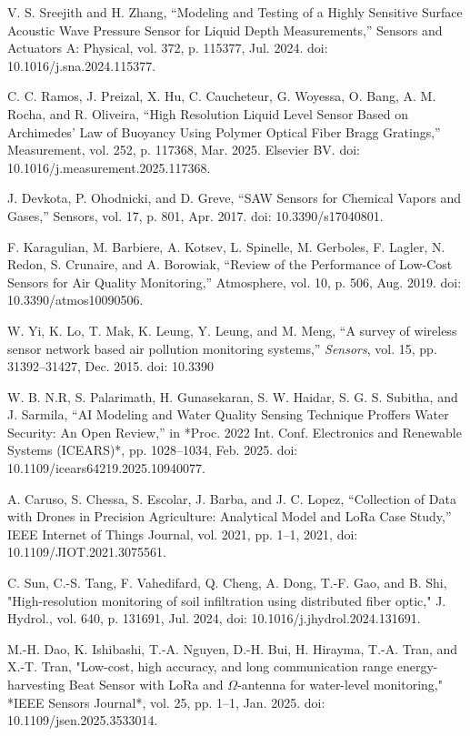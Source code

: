 \documentclass[conference]{IEEEtran}
\begin{document}
\begin{thebibliography}{00}
 V. S. Sreejith and H. Zhang, 
``Modeling and Testing of a Highly Sensitive Surface Acoustic Wave Pressure Sensor for Liquid Depth Measurements,'' 
Sensors and Actuators A: Physical, vol. 372, p. 115377, Jul. 2024. doi: 10.1016/j.sna.2024.115377.

 C. C. Ramos, J. Preizal, X. Hu, C. Caucheteur, G. Woyessa, O. Bang, A. M. Rocha, and R. Oliveira, 
``High Resolution Liquid Level Sensor Based on Archimedes’ Law of Buoyancy Using Polymer Optical Fiber Bragg Gratings,'' 
Measurement, vol. 252, p. 117368, Mar. 2025. Elsevier BV. doi: 10.1016/j.measurement.2025.117368.



 J. Devkota, P. Ohodnicki, and D. Greve, 
``SAW Sensors for Chemical Vapors and Gases,'' 
Sensors, vol. 17, p. 801, Apr. 2017. 
doi: 10.3390/s17040801.

 F. Karagulian, M. Barbiere, A. Kotsev, L. Spinelle, M. Gerboles, F. Lagler, N. Redon, S. Crunaire, and A. Borowiak, 
``Review of the Performance of Low-Cost Sensors for Air Quality Monitoring,'' 
Atmosphere, vol. 10, p. 506, Aug. 2019. doi: 10.3390/atmos10090506.

 W. Yi, K. Lo, T. Mak, K. Leung, Y. Leung, and M. Meng, ``A survey of wireless sensor network based air pollution monitoring systems,'' \emph{Sensors}, vol. 15, pp. 31392--31427, Dec. 2015. doi: 10.3390

 W. B. N.R, S. Palarimath, H. Gunasekaran, S. W. Haidar, S. G. S. Subitha, and J. Sarmila, 
``AI Modeling and Water Quality Sensing Technique Proffers Water Security: An Open Review,'' 
in *Proc. 2022 Int. Conf. Electronics and Renewable Systems (ICEARS)*, pp. 1028--1034, Feb. 2025. doi: 10.1109/icears64219.2025.10940077.

 A. Caruso, S. Chessa, S. Escolar, J. Barba, and J. C. Lopez, “Collection of Data with Drones in Precision Agriculture: Analytical Model and LoRa Case Study,” IEEE Internet of Things Journal, vol. 2021, pp. 1–1, 2021, doi: 10.1109/JIOT.2021.3075561.

 C. Sun, C.-S. Tang, F. Vahedifard, Q. Cheng, A. Dong, T.-F. Gao, and B. Shi, "High-resolution monitoring of soil infiltration using distributed fiber optic," J. Hydrol., vol. 640, p. 131691, Jul. 2024, doi: 10.1016/j.jhydrol.2024.131691.
 
M.-H. Dao, K. Ishibashi, T.-A. Nguyen, D.-H. Bui, H. Hirayma, T.-A. Tran, and X.-T. Tran, 
"Low-cost, high accuracy, and long communication range energy-harvesting Beat Sensor with LoRa and $\Omega$-antenna for water-level monitoring,"
*IEEE Sensors Journal*, vol. 25, pp. 1--1, Jan. 2025. doi: 10.1109/jsen.2025.3533014.


\end{thebibliography}
\end{document}
